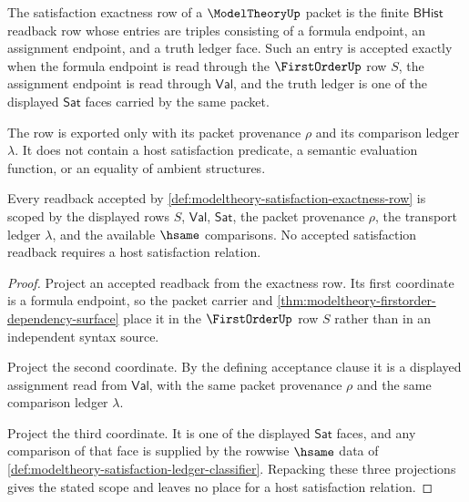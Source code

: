 \begin{definition}\label{def:modeltheory-satisfaction-exactness-row}
The satisfaction exactness row of a $\ModelTheoryUp$ packet is the finite
$\mathsf{BHist}$ readback row whose entries are triples consisting of a
formula endpoint, an assignment endpoint, and a truth ledger face. Such an
entry is accepted exactly when the formula endpoint is read through the
$\FirstOrderUp$ row $S$, the assignment endpoint is read through
$\mathsf{Val}$, and the truth ledger is one of the displayed
$\mathsf{Sat}$ faces carried by the same packet.

The row is exported only with its packet provenance $\rho$ and its comparison
ledger $\lambda$. It does not contain a host satisfaction predicate, a
semantic evaluation function, or an equality of ambient structures.
\end{definition}

\begin{theorem}\label{thm:modeltheory-satisfaction-exactness-scope}
Every readback accepted by
\autoref{def:modeltheory-satisfaction-exactness-row} is scoped by the displayed
rows $S$, $\mathsf{Val}$, $\mathsf{Sat}$, the packet provenance $\rho$, the
transport ledger $\lambda$, and the available $\hsame$ comparisons. No
accepted satisfaction readback requires a host satisfaction relation.
\end{theorem}
\begin{proof}
Project an accepted readback from the exactness row. Its first coordinate is a
formula endpoint, so the packet carrier and
\autoref{thm:modeltheory-firstorder-dependency-surface} place it in the
$\FirstOrderUp$ row $S$ rather than in an independent syntax source.

Project the second coordinate. By the defining acceptance clause it is a
displayed assignment read from $\mathsf{Val}$, with the same packet provenance
$\rho$ and the same comparison ledger $\lambda$.

Project the third coordinate. It is one of the displayed $\mathsf{Sat}$ faces,
and any comparison of that face is supplied by the rowwise $\hsame$ data of
\autoref{def:modeltheory-satisfaction-ledger-classifier}. Repacking these
three projections gives the stated scope and leaves no place for a host
satisfaction relation.
\end{proof}

